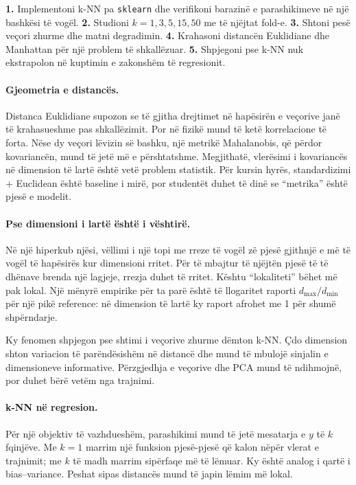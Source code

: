\documentclass[12pt,a4paper,oneside]{book}
\begin{document}
\textbf{1.} Implementoni k-NN pa \texttt{sklearn} dhe verifikoni barazinë e parashikimeve në një bashkësi të vogël. \textbf{2.} Studioni $k=1,3,5,15,50$ me të njëjtat fold-e. \textbf{3.} Shtoni pesë veçori zhurme dhe matni degradimin. \textbf{4.} Krahasoni distancën Euklidiane dhe Manhattan për një problem të shkallëzuar. \textbf{5.} Shpjegoni pse k-NN nuk ekstrapolon në kuptimin e zakonshëm të regresionit.


\paragraph{Gjeometria e distancës.}
Distanca Euklidiane supozon se të gjitha drejtimet në hapësirën e veçorive janë të krahasueshme pas shkallëzimit. Por në fizikë mund të ketë korrelacione të forta. Nëse dy veçori lëvizin së bashku, një metrikë Mahalanobis, që përdor kovariancën, mund të jetë më e përshtatshme. Megjithatë, vlerësimi i kovariancës në dimension të lartë është vetë problem statistik. Për kursin hyrës, standardizimi + Euclidean është baseline i mirë, por studentët duhet të dinë se ``metrika'' është pjesë e modelit.

\paragraph{Pse dimensioni i lartë është i vështirë.}
Në një hiperkub njësi, vëllimi i një topi me rreze të vogël zë pjesë gjithnjë e më të vogël të hapësirës kur dimensioni rritet. Për të mbajtur të njëjtën pjesë të të dhënave brenda një lagjeje, rrezja duhet të rritet. Kështu ``lokaliteti'' bëhet më pak lokal. Një mënyrë empirike për ta parë është të llogaritet raporti $d_{\max}/d_{\min}$ për një pikë reference: në dimension të lartë ky raport afrohet me 1 për shumë shpërndarje.

Ky fenomen shpjegon pse shtimi i veçorive zhurme dëmton k-NN. Çdo dimension shton variacion të parëndësishëm në distancë dhe mund të mbulojë sinjalin e dimensioneve informative. Përzgjedhja e veçorive dhe PCA mund të ndihmojnë, por duhet bërë vetëm nga trajnimi.

\paragraph{k-NN në regresion.}
Për një objektiv të vazhdueshëm, parashikimi mund të jetë mesatarja e $y$ të $k$ fqinjëve. Me $k=1$ marrim një funksion pjesë-pjesë që kalon nëpër vlerat e trajnimit; me $k$ të madh marrim sipërfaqe më të lëmuar. Ky është analog i qartë i bias--variance. Peshat sipas distancës mund të japin lëmim më lokal.
\end{document}

